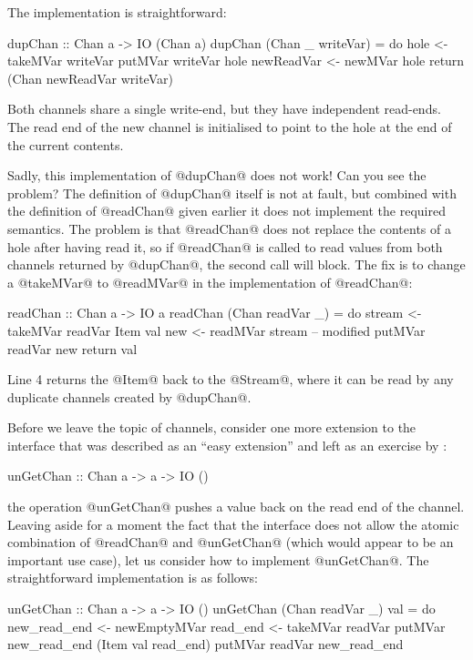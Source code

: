 The implementation is straightforward:

\begin{haskell}
dupChan :: Chan a -> IO (Chan a)
dupChan (Chan _ writeVar) = do
   hole       <- takeMVar writeVar
   putMVar writeVar hole
   newReadVar <- newMVar hole
   return (Chan newReadVar writeVar)
\end{haskell}

\noindent Both channels share a single write-end, but they have
independent read-ends.  The read end of the new channel is initialised
to point to the hole at the end of the current contents.

Sadly, this implementation of @dupChan@ does not work!  Can you see
the problem?  The definition of @dupChan@ itself is not at fault, but
combined with the definition of @readChan@ given earlier it does not
implement the required semantics.  The problem is that @readChan@ does
not replace the contents of a hole after having read it, so if
@readChan@ is called to read values from both channels returned by
@dupChan@, the second call will block.  The fix is to change a
@takeMVar@ to @readMVar@ in the implementation of @readChan@:

\begin{numhaskell}
readChan :: Chan a -> IO a
readChan (Chan readVar _) = do
  stream <- takeMVar readVar
  Item val new <- readMVar stream -- modified
  putMVar readVar new
  return val
\end{numhaskell}

\noindent Line 4 returns the @Item@ back to the @Stream@, where it can
be read by any duplicate channels created by @dupChan@.

Before we leave the topic of channels, consider one more extension to
the interface that was described as an ``easy extension'' and left as
an exercise by \citet{jones96concurrent}:

\begin{haskell}
unGetChan :: Chan a -> a -> IO ()
\end{haskell}

\noindent the operation @unGetChan@ pushes a value back on the read
end of the channel.  Leaving aside for a moment the fact that the
interface does not allow the atomic combination of @readChan@ and
@unGetChan@ (which would appear to be an important use case), let us
consider how to implement @unGetChan@.  The straightforward
implementation is as follows:

\begin{numhaskell}
unGetChan :: Chan a -> a -> IO ()
unGetChan (Chan readVar _) val = do
   new_read_end <- newEmptyMVar
   read_end <- takeMVar readVar
   putMVar new_read_end (Item val read_end)
   putMVar readVar new_read_end
\end{numhaskell}

